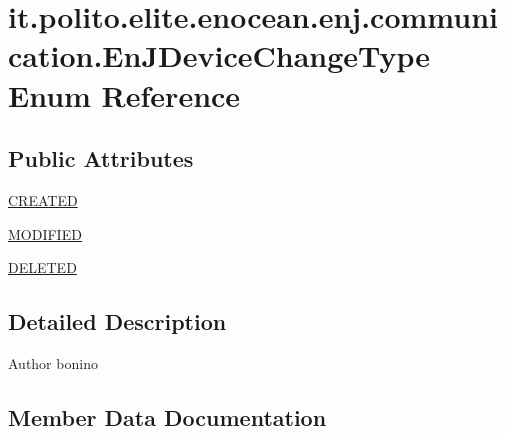 \hypertarget{enumit_1_1polito_1_1elite_1_1enocean_1_1enj_1_1communication_1_1_en_j_device_change_type}{}\section{it.\+polito.\+elite.\+enocean.\+enj.\+communication.\+En\+J\+Device\+Change\+Type Enum Reference}
\label{enumit_1_1polito_1_1elite_1_1enocean_1_1enj_1_1communication_1_1_en_j_device_change_type}
\subsection*{Public Attributes}
\begin{DoxyCompactItemize}
\item 
\hyperlink{enumit_1_1polito_1_1elite_1_1enocean_1_1enj_1_1communication_1_1_en_j_device_change_type_a8c5d385a7318e0b66d168d6418de8e85}{C\+R\+E\+A\+T\+ED}
\item 
\hyperlink{enumit_1_1polito_1_1elite_1_1enocean_1_1enj_1_1communication_1_1_en_j_device_change_type_aca5687c5e46e00a17c6807d47d19ae24}{M\+O\+D\+I\+F\+I\+ED}
\item 
\hyperlink{enumit_1_1polito_1_1elite_1_1enocean_1_1enj_1_1communication_1_1_en_j_device_change_type_ae85f7cda6d72e93a1df185d3f814c49b}{D\+E\+L\+E\+T\+ED}
\end{DoxyCompactItemize}


\subsection{Detailed Description}
\begin{DoxyAuthor}{Author}
bonino 
\end{DoxyAuthor}


\subsection{Member Data Documentation}
\hypertarget{enumit_1_1polito_1_1elite_1_1enocean_1_1enj_1_1communication_1_1_en_j_device_change_type_a8c5d385a7318e0b66d168d6418de8e85}{}\label{enumit_1_1polito_1_1elite_1_1enocean_1_1enj_1_1communication_1_1_en_j_device_change_type_a8c5d385a7318e0b66d168d6418de8e85} 
